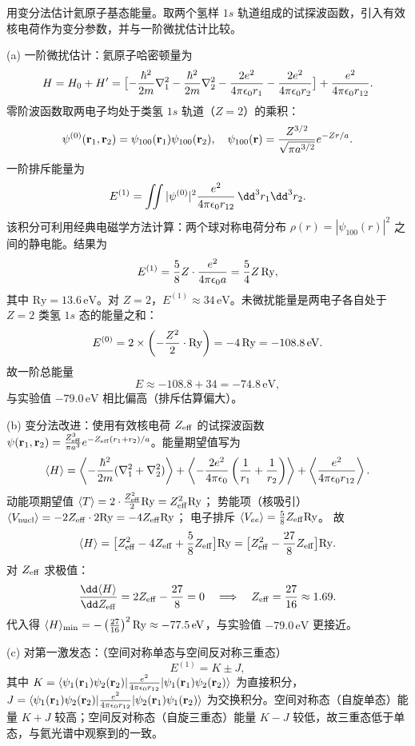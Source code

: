 \begin{question}
用变分法估计氦原子基态能量。取两个氢样 $1s$ 轨道组成的试探波函数，引入有效核电荷作为变分参数，并与一阶微扰估计比较。
\end{question}
\begin{solution}
(a) 一阶微扰估计：氦原子哈密顿量为
\[
H = H_0 + H' = \bigl[ -{\hbar^2\over2m}\nabla_1^2 - {\hbar^2\over2m}\nabla_2^2 - {2e^2\over4\pi\epsilon_0 r_1} - {2e^2\over4\pi\epsilon_0 r_2} \bigr] + {e^2\over4\pi\epsilon_0 r_{12}}.
\]
零阶波函数取两电子均处于类氢 $1s$ 轨道（$Z=2$）的乘积：
\[
\psi^{(0)}(\mathbf r_1,\mathbf r_2) = \psi_{100}(\mathbf r_1)\psi_{100}(\mathbf r_2),
\quad \psi_{100}(\mathbf r) = {Z^{3/2}\over\sqrt{\pi a^{3/2}}}e^{-Zr/a}.
\]
一阶排斥能量为
\[
E^{(1)} = \iint |\psi^{(0)}|^2 {e^2\over4\pi\epsilon_0 r_{12}}\,\dd^3r_1\dd^3r_2.
\]
该积分可利用经典电磁学方法计算：两个球对称电荷分布 $\rho(r)=|\psi_{100}(r)|^2$ 之间的静电能。结果为
\[
E^{(1)} = {5\over8}Z\cdot{e^2\over4\pi\epsilon_0 a} = {5\over4}Z\,\mathrm{Ry},
\]
其中 $\mathrm{Ry}=13.6\,\mathrm{eV}$。对 $Z=2$，$E^{(1)}\approx34\,\mathrm{eV}$。未微扰能量是两电子各自处于 $Z=2$ 类氢 $1s$ 态的能量之和：
\[
E^{(0)} = 2\times\left(-{Z^2\over2}\cdot{\mathrm{Ry}}\right) = -4\,\mathrm{Ry} = -108.8\,\mathrm{eV}.
\]
故一阶总能量
\[
E \approx -108.8 + 34 = -74.8\,\mathrm{eV},
\]
与实验值 $-79.0\,\mathrm{eV}$ 相比偏高（排斥估算偏大）。

(b) 变分法改进：使用有效核电荷 $Z_{\rm eff}$ 的试探波函数 $\psi(\mathbf r_1,\mathbf r_2) = {Z_{\rm eff}^3\over\pi a^3}e^{-Z_{\rm eff}(r_1+r_2)/a}$。能量期望值写为
\[
\langle H\rangle = \left\langle -{\hbar^2\over2m}(\nabla_1^2+\nabla_2^2)\right\rangle
+ \left\langle -{2e^2\over4\pi\epsilon_0}\left({1\over r_1}+{1\over r_2}\right)\right\rangle
+ \left\langle {e^2\over4\pi\epsilon_0 r_{12}}\right\rangle.
\]
动能项期望值 $\langle T\rangle = 2\cdot{Z_{\rm eff}^2\over2}\mathrm{Ry} = Z_{\rm eff}^2\mathrm{Ry}$；
势能项（核吸引）$\langle V_{\rm nucl}\rangle = -2Z_{\rm eff}\cdot2\mathrm{Ry} = -4Z_{\rm eff}\mathrm{Ry}$；
电子排斥 $\langle V_{ee}\rangle = {5\over8}Z_{\rm eff}\mathrm{Ry}$。
故
\[
\langle H\rangle = \bigl[Z_{\rm eff}^2 - 4Z_{\rm eff} + {5\over8}Z_{\rm eff}\bigr]\mathrm{Ry}
= \bigl[Z_{\rm eff}^2 - {27\over8}Z_{\rm eff}\bigr]\mathrm{Ry}.
\]
对 $Z_{\rm eff}$ 求极值：
\[
{\dd\langle H\rangle\over\dd Z_{\rm eff}} = 2Z_{\rm eff} - {27\over8} = 0
\quad\Longrightarrow\quad Z_{\rm eff} = {27\over16} \approx 1.69.
\]
代入得 $\langle H\rangle_{\min} = -\left({27\over16}\right)^2\mathrm{Ry} \approx -77.5\,\mathrm{eV}$，与实验值 $-79.0\,\mathrm{eV}$ 更接近。

(c) 对第一激发态：（空间对称单态与空间反对称三重态）
\[
E^{(1)} = K \pm J,
\]
其中 $K=\langle\psi_1(\mathbf r_1)\psi_2(\mathbf r_2)|{e^2\over4\pi\epsilon_0 r_{12}}|\psi_1(\mathbf r_1)\psi_2(\mathbf r_2)\rangle$ 为直接积分，$J=\langle\psi_1(\mathbf r_1)\psi_2(\mathbf r_2)|{e^2\over4\pi\epsilon_0 r_{12}}|\psi_2(\mathbf r_1)\psi_1(\mathbf r_2)\rangle$ 为交换积分。空间对称态（自旋单态）能量 $K+J$ 较高；空间反对称态（自旋三重态）能量 $K-J$ 较低，故三重态低于单态，与氦光谱中观察到的一致。
\end{solution}

